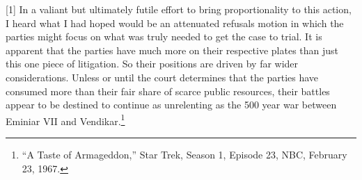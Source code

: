 [1] In a valiant but ultimately futile effort to bring proportionality to this action, I heard what I had hoped would be an attenuated refusals motion in which the parties might focus on what was truly needed to get the case to trial. It is apparent that the parties have much more on their respective plates than just this one piece of litigation. So their positions are driven by far wider considerations. Unless or until the court determines that the parties have consumed more than their fair share of scarce public resources, their battles appear to be destined to continue as unrelenting as the 500 year war between Eminiar VII and Vendikar.\footnote{“A Taste of Armageddon,” Star Trek, Season 1, Episode 23, NBC, February 23, 1967.}
\endinput